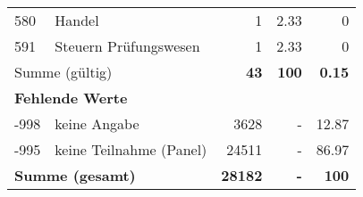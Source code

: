 \begin{longtable}{lXrrr}
        580 & \multicolumn{1}{X}{Handel} & %
          \num{1} &
          \num[round-mode=places,round-precision=2]{2,33} &
          \num[round-mode=places,round-precision=2]{0} \\

        591 & \multicolumn{1}{X}{Steuern Prüfungswesen} & %
          \num{1} &
          \num[round-mode=places,round-precision=2]{2,33} &
          \num[round-mode=places,round-precision=2]{0} \\

     \midrule
     \multicolumn{2}{l}{Summe (gültig)} &
       \textbf{\num{43}} &
     \textbf{100} &
       \textbf{\num[round-mode=places,round-precision=2]{0,15}} \\
     \multicolumn{5}{l}{\textbf{Fehlende Werte}}\\
       -998 &
       keine Angabe &
         \num{3628} &
        - &
         \num[round-mode=places,round-precision=2]{12,87} \\
       -995 &
       keine Teilnahme (Panel) &
         \num{24511} &
        - &
         \num[round-mode=places,round-precision=2]{86,97} \\
     \midrule
     \multicolumn{2}{l}{\textbf{Summe (gesamt)}} &
          \textbf{\num{28182}} &
        \textbf{-} &
        \textbf{100} \\
     \bottomrule
     \end{longtable}
     
